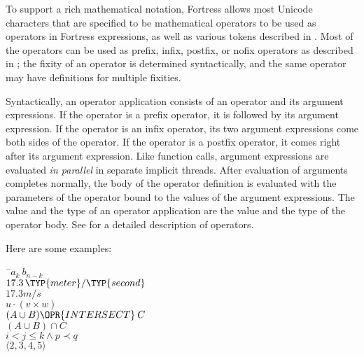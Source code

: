 To support a rich mathematical notation, Fortress allows most Unicode
characters that are specified to be mathematical operators to be used as
operators in Fortress expressions, as well as various tokens described in
.
Most of the operators can be used as prefix, infix, postfix, or
nofix operators as described in ;
the fixity of an operator is determined syntactically, and
the same operator may have definitions for multiple fixities.

Syntactically, an operator application consists of an operator and its
argument expressions.  If the operator is a prefix operator, it is followed
by its argument expression.  If the operator is an infix operator, its two
argument expressions come both sides of the operator.  If the operator is a
postfix operator, it comes right after its argument expression.
Like function calls,
argument expressions are evaluated \emph{in parallel} in separate implicit threads.
After evaluation of arguments completes normally,
the body of the operator definition is evaluated
with the parameters of the operator bound to the values of the argument
expressions.  The value and the type of an operator application are the
value and the type of the operator body.
See  for a detailed description of operators.


Here are some examples:



\begin{Fortress}
{\tt~}\pushtabs\=\+\( a_k\:b_{n-k}\)\\
\( 17.3\,\TYP{meter}/\TYP{second}\)\\
\( 17.3 m/s\)\\
\( u \cdot (v \times w)\)\\
\( (A \cup B) \OPR{INTERSECT}\:C\)\\
\( (A \cup B) \cap C\)\\
\( i < j \leq k \wedge p \prec q\)\\
\( \langle{}2, 3, 4, 5\rangle\)\-\\\poptabs
\end{Fortress}
